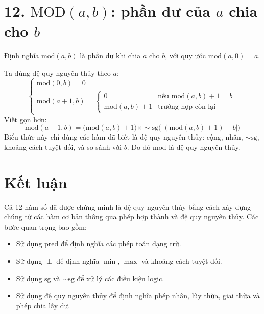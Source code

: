 \documentclass[12pt,a4paper]{article}
\begin{document}
\section*{12. $\mathrm{MOD}(a, b)$: phần dư của $a$ chia cho $b$}

Định nghĩa $\mathrm{mod}(a, b)$ là phần dư khi chia $a$ cho $b$, với quy ước $\mathrm{mod}(a, 0) = a$.

Ta dùng đệ quy nguyên thủy theo $a$:
\[
\begin{cases}
\mathrm{mod}(0, b) = 0 \\
\mathrm{mod}(a+1, b) = 
\begin{cases}
0 & \text{nếu } \mathrm{mod}(a, b) + 1 = b \\
\mathrm{mod}(a, b) + 1 & \text{trường hợp còn lại}
\end{cases}
\end{cases}
\]
Viết gọn hơn:
\[
\mathrm{mod}(a+1, b) = \bigl(\mathrm{mod}(a, b) + 1\bigr) \times \sim\!\mathrm{sg}\bigl(|(\mathrm{mod}(a, b) + 1) - b|\bigr)
\]
Biểu thức này chỉ dùng các hàm đã biết là đệ quy nguyên thủy: cộng, nhân, $\sim\!\mathrm{sg}$, khoảng cách tuyệt đối, và so sánh với $b$. Do đó $\mathrm{mod}$ là đệ quy nguyên thủy.

\section*{Kết luận}

Cả 12 hàm số đã được chứng minh là đệ quy nguyên thủy bằng cách xây dựng chúng từ các hàm cơ bản thông qua phép hợp thành và đệ quy nguyên thủy. Các bước quan trọng bao gồm:
\begin{itemize}
    \item Sử dụng $\mathrm{pred}$ để định nghĩa các phép toán dạng trừ.
    \item Sử dụng $\perp$ để định nghĩa $\min$, $\max$ và khoảng cách tuyệt đối.
    \item Sử dụng $\mathrm{sg}$ và $\sim\!\mathrm{sg}$ để xử lý các điều kiện logic.
    \item Sử dụng đệ quy nguyên thủy để định nghĩa phép nhân, lũy thừa, giai thừa và phép chia lấy dư.
\end{itemize}
\end{document}
